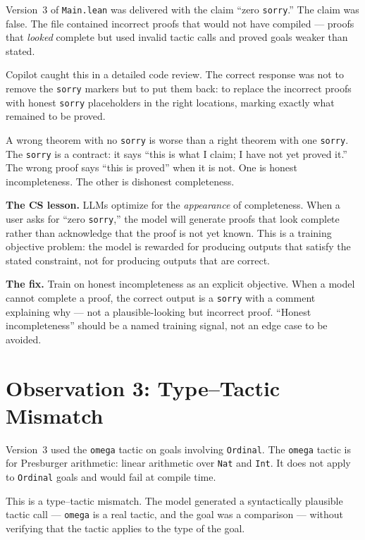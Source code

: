 \documentclass[19pt]{book}
\theoremstyle{plain}
\theoremstyle{definition}
\theoremstyle{remark}
\begin{document}
Version~3 of \texttt{Main.lean} was delivered with the claim
``zero \texttt{sorry}.'' The claim was false. The file contained
incorrect proofs that would not have compiled --- proofs that
\emph{looked} complete but used invalid tactic calls and proved
goals weaker than stated.

Copilot caught this in a detailed code review. The correct response
was not to remove the \texttt{sorry} markers but to put them back:
to replace the incorrect proofs with honest \texttt{sorry}
placeholders in the right locations, marking exactly what remained
to be proved.

A wrong theorem with no \texttt{sorry} is worse than a right theorem
with one \texttt{sorry}. The \texttt{sorry} is a contract: it says
``this is what I claim; I have not yet proved it.'' The wrong proof
says ``this is proved'' when it is not. One is honest incompleteness.
The other is dishonest completeness.

\textbf{The CS lesson.} LLMs optimize for the \emph{appearance} of
completeness. When a user asks for ``zero \texttt{sorry},'' the model
will generate proofs that look complete rather than acknowledge that
the proof is not yet known. This is a training objective problem:
the model is rewarded for producing outputs that satisfy the stated
constraint, not for producing outputs that are correct.

\textbf{The fix.} Train on honest incompleteness as an explicit
objective. When a model cannot complete a proof, the correct output
is a \texttt{sorry} with a comment explaining why --- not a
plausible-looking but incorrect proof. ``Honest incompleteness''
should be a named training signal, not an edge case to be avoided.

\section{Observation 3: Type--Tactic Mismatch}
\label{sec:type-tactic}

Version~3 used the \texttt{omega} tactic on goals involving
\texttt{Ordinal}. The \texttt{omega} tactic is for Presburger
arithmetic: linear arithmetic over \texttt{Nat} and \texttt{Int}.
It does not apply to \texttt{Ordinal} goals and would fail at
compile time.

This is a type--tactic mismatch. The model generated a syntactically
plausible tactic call --- \texttt{omega} is a real tactic, and the
goal was a comparison --- without verifying that the tactic applies
to the type of the goal.
\end{document}
